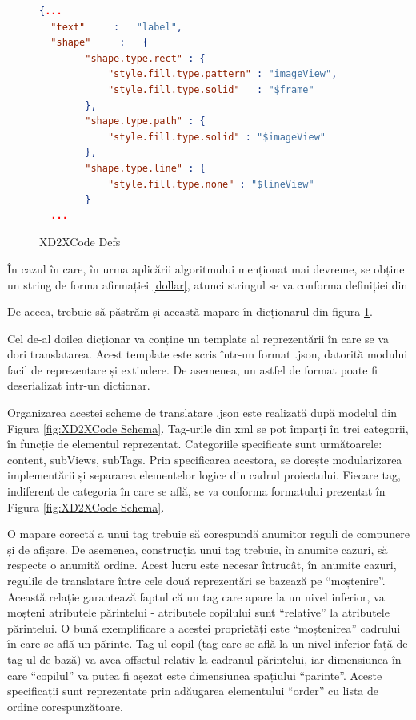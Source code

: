 \begin{figure}[!htbp]
\begin{lstlisting}[language=json,firstnumber=1]
  {...
  "text"     :   "label",
  "shape"     :   {
        "shape.type.rect" : {
            "style.fill.type.pattern" : "imageView",
            "style.fill.type.solid"   : "$frame"
        },
        "shape.type.path" : {
            "style.fill.type.solid" : "$imageView"
        },
        "shape.type.line" : {
            "style.fill.type.none" : "$lineView"
        }
  ...
\end{lstlisting}
\caption{XD2XCode Defs} \label{fig:XD2XCode Defs}
\end{figure}

În cazul în care, în urma aplicării algoritmului menționat mai devreme, se obține un string de forma afirmației \ref{dollar}, atunci stringul se va conforma definiției din 

De aceea, trebuie să păstrăm și această mapare în dicționarul din figura \ref{fig:XD2XCode Defs}.

Cel de-al doilea dicționar va conține un template al reprezentării în care se va dori translatarea. Acest template este scris într-un format .json, datorită modului facil de reprezentare și extindere. De asemenea, un astfel de format poate fi deserializat intr-un dictionar. 

Organizarea acestei scheme de translatare .json este realizată după modelul din Figura \ref{fig:XD2XCode Schema}. Tag-urile din xml se pot împarți în trei categorii, în funcție de elementul reprezentat. Categoriile specificate sunt următoarele: content, subViews, subTags. Prin specificarea acestora, se dorește modularizarea implementării și separarea elementelor logice din cadrul proiectului. Fiecare tag, indiferent de categoria în care se află, se va conforma formatului prezentat în Figura \ref{fig:XD2XCode Schema}.

O mapare corectă a unui tag trebuie să corespundă anumitor reguli de compunere și de afișare. De asemenea, construcția unui tag trebuie, în anumite cazuri, să respecte o anumită ordine. Acest lucru este necesar întrucât, în anumite cazuri, regulile de translatare între cele două reprezentări se bazează pe “moștenire”. Această relație garantează faptul că un tag care apare la un nivel inferior, va moșteni atributele părintelui - atributele copilului sunt “relative” la atributele părintelui. O bună exemplificare a acestei proprietăți este “moștenirea” cadrului în care se află un părinte. Tag-ul copil (tag care se află la un nivel inferior față de tag-ul de bază) va avea offsetul relativ la cadranul părintelui, iar dimensiunea în care “copilul” va putea fi așezat este dimensiunea spațiului “parinte”. Aceste specificații sunt reprezentate prin adăugarea elementului “order” cu lista de ordine corespunzătoare.

